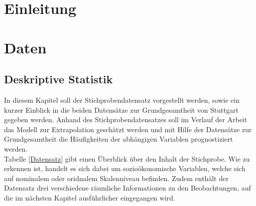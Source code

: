 \documentclass{Vorlage}
\begin{document}
\restoregeometry


\pagestyle{plain}

\tableofcontents %

\newpage %

\listoffigures %

\listoftables %

\newpage



\pagestyle{fancy}

\section{Einleitung}

\newpage

\section{Daten}
\subsection{Deskriptive Statistik}

In diesem Kapitel soll der Stichprobendatensatz vorgestellt werden, sowie ein kurzer Einblick in  die beiden Datensätze zur Grundgesamtheit von Stuttgart gegeben werden. Anhand des Stichprobendatensatzes soll im Verlauf der Arbeit das Modell zur Extrapolation geschätzt werden und mit Hilfe der Datensätze zur Grundgesamtheit die Häufigkeiten der abhängigen Variablen prognostiziert werden. \\
Tabelle \ref{Datensatz} gibt einen Überblick über den Inhalt der Stichprobe. Wie zu erkennen ist, handelt es sich dabei um sozioökonomische Variablen, welche sich auf nominalem oder oridnalem Skalenniveau befinden. Zudem enthält der Datensatz drei verschiedene räumliche Informationen zu den Beobachtungen, auf die im nächsten Kapitel ausführlicher eingegangen wird.\\
\end{document}
